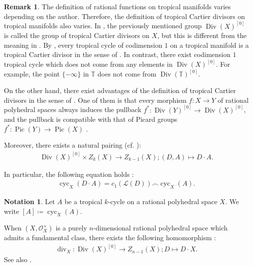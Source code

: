 \documentclass[a4paper,dvipdfmx,reqno,12pt]{amsart}
\theoremstyle{definition}
\newtheorem{notation}[theorem]{Notation}
\newtheorem{remark}[theorem]{Remark}
\newcommand{\deq}{\coloneqq}
\newcommand{\opn}[1]{\operatorname{#1}}
\numberwithin{equation}{section}
\begin{document}
\begin{remark}
The definition of rational functions on tropical
manifolds varies depending on the author.
Therefore, the definition of tropical
Cartier divisors
on tropical manifolds also varies.
In \cite{MR3894860,MR4637248},
the previously mentioned group
$\opn{Div}(X)^{[0]}$ is called
the group of tropical Cartier divisors on $X$,
but this is different from the meaning
in \cite{demedrano2023chern}.
By \cite[Proposition 3.27]{shaw2015tropical},
every tropical cycle of codimension $1$ on a tropical manifold
is a tropical Cartier divisor in the sense of
\cite{shaw2015tropical,demedrano2023chern}.
In contrast, there exist codimension $1$
tropical cycle which does not come from any
elements in $\opn{Div}(X)^{[0]}$.
For example,
the point $\{-\infty\}$ in $\mathbb{T}$ does not
come from $\opn{Div}(\mathbb{T})^{[0]}$.

On the other hand, there exist advantages of
the definition of tropical Cartier divisors in the
sense of \cite{MR3894860,MR4637248}.
One of them is that 
every morphism $f\colon X\to Y$ of rational polyhedral
spaces always induces the pullback
$f^{*}\colon \opn{Div}(Y)^{[0]} \to \opn{Div}(X)^{[0]}$,
and the pullback is compatible with that of 
Picard groups $f^{*}\colon \opn{Pic}(Y) \to \opn{Pic}(X)$
\cite[Propoisition 3.15]{MR4637248}.
\end{remark}

Moreover,
there exists a natural pairing
\cite[]{MR4637248}
(cf. \cite[Definition 6.5]{MR2591823}):
\begin{align}
\label{equation-divisor-pairing}
\opn{Div}(X)^{[0]}\times Z_{k}(X)\to Z_{k-1}(X);
(D,A) \mapsto D\cdot A.
\end{align}

In particular, the following equation holds
\cite[Proposition 5.12]{MR4637248}:
\begin{align}
\opn{cyc}_X(D\cdot A)=c_1(\mathcal{L}(D))
\frown \opn{cyc}_X(A).
\end{align}

\begin{notation}
Let $A$ be a tropical $k$-cycle on a rational polyhedral space $X$.
We write $[A]\deq \opn{cyc}_X(A)$.
\end{notation}

When $(X,\mathcal{O}_X^{\times})$ is 
a purely $n$-dimensional rational polyhedral space
which admits a fundamental class, there exists 
the following homomorphism 
\cite[Definition 4.14]{MR3894860}:
\begin{align}
\label{equation-divisor-map}
\opn{div}_X\colon
\opn{Div}(X)^{[0]}\to Z_{n-1}(X); D\mapsto D\cdot X.  
\end{align}
See also \cite[Theorem 4.15]{MR3894860}.
\end{document}
